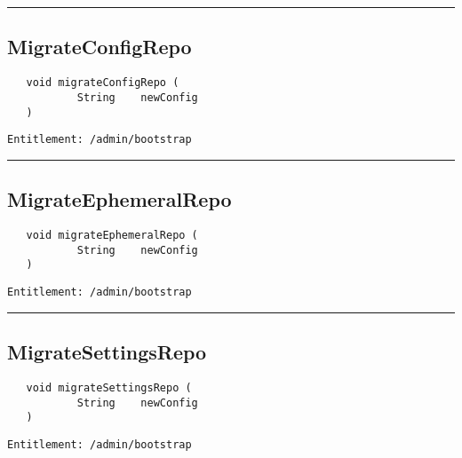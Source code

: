 \rule{12cm}{2pt}
\subsection{MigrateConfigRepo}
\label{Api:MigrateConfigRepo}
\begin{Verbatim}
   void migrateConfigRepo (
           String    newConfig
   )
\end{Verbatim}
\begin{Verbatim}[formatcom=\color{Maroon}]
  Entitlement: /admin/bootstrap
\end{Verbatim}



\rule{12cm}{2pt}
\subsection{MigrateEphemeralRepo}
\label{Api:MigrateEphemeralRepo}
\begin{Verbatim}
   void migrateEphemeralRepo (
           String    newConfig
   )
\end{Verbatim}
\begin{Verbatim}[formatcom=\color{Maroon}]
  Entitlement: /admin/bootstrap
\end{Verbatim}



\rule{12cm}{2pt}
\subsection{MigrateSettingsRepo}
\label{Api:MigrateSettingsRepo}
\begin{Verbatim}
   void migrateSettingsRepo (
           String    newConfig
   )
\end{Verbatim}
\begin{Verbatim}[formatcom=\color{Maroon}]
  Entitlement: /admin/bootstrap
\end{Verbatim}



